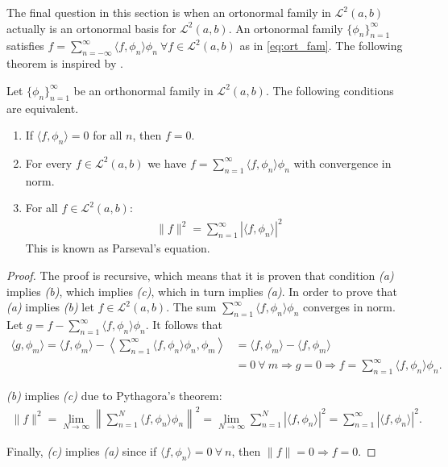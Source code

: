 The final question in this section is when an ortonormal family in $\mathcal{L}^2(a,b)$ actually is an ortonormal basis for $\mathcal{L}^2(a,b)$. An ortonormal family $\{\phi_n\}_{n=1}^\infty$ satisfies $f = \sum_{n=-\infty}^\infty \langle f, \phi_n \rangle \phi_n \ \forall f \in \mathcal{L}^2(a,b)$ as in \eqref{eq:ort_fam}. The following theorem is inspired by \cite{page 77, FAA}.

\begin{theorem} \label{theo:Fourier_series_Parseval}
Let $\{\phi_n\}_{n=1}^\infty$ be an orthonormal family in $\mathcal{L}^2(a,b)$. The following conditions are equivalent.
\begin{enumerate}[label=(\alph*)]
\item If $\langle f, \phi_n \rangle = 0$ for all $n$, then $f = 0$.
\item For every $f \in \mathcal{L}^2(a,b)$ we have $f = \sum_{n=1}^\infty \langle f, \phi_n \rangle \phi_n$ with convergence in norm.\\
\item For all $f \in \mathcal{L}^2(a,b)$:
\begin{align*}
\|f\|^2 = \sum_{n=1}^\infty |\langle f,\phi_n \rangle|^2
\end{align*}
This is known as Parseval's equation.
\end{enumerate}
\end{theorem}

\begin{proof}
The proof is recursive, which means that it is proven that condition \textit{(a)} implies \textit{(b)}, which implies \textit{(c)}, which in turn implies \textit{(a)}. In order to prove that \textit{(a)} implies \textit{(b)} let $f\in\mathcal{L}^2(a,b)$. The sum $\sum_{n=1}^\infty \langle f,\phi_n \rangle \phi_n$ converges in norm. Let $g = f - \sum_{n=1}^\infty \langle f,\phi_n \rangle \phi_n$. It follows that
\begin{align*}
\langle g,\phi_m \rangle = \langle f, \phi_m \rangle - \left\langle \sum_{n=1}^\infty \langle f,\phi_n\rangle \phi_n, \phi_m \right\rangle &= \langle f, \phi_m \rangle - \langle f, \phi_m \rangle \\
&= 0 \ \forall \ m \Rightarrow g = 0 \Rightarrow f = \sum_{n=1}^\infty \langle f,\phi_n \rangle \phi_n.
\end{align*}

\textit{(b)} implies \textit{(c)} due to Pythagora's theorem:
\begin{align*}
\|f\|^2 = \lim_{N\to\infty} \left\| \sum_{n=1}^N \langle f,\phi_n \rangle \phi_n \right\|^2 = \lim_{N\to\infty} \sum_{n=1}^N |\langle f,\phi_n \rangle|^2 = \sum_{n=1}^\infty |\langle f,\phi_n \rangle|^2.
\end{align*}

Finally, \textit{(c)} implies \textit{(a)} since if $\langle f,\phi_n \rangle = 0 \ \forall \ n$, then $\|f\| = 0 \Rightarrow f = 0$.
\end{proof}


